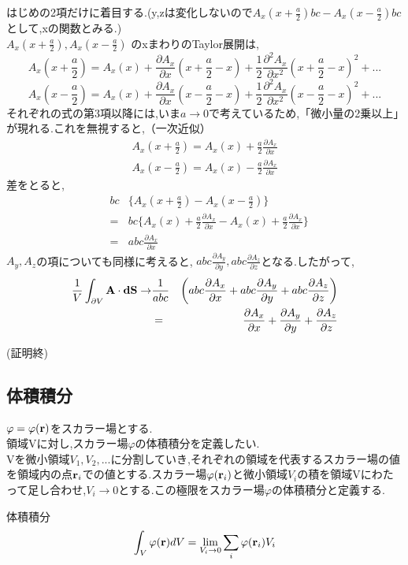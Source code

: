 \documentclass[../main]{subfiles}
\begin{document}
はじめの2項だけに着目する.(y,zは変化しないので$A_x(x+\frac{a}{2})bc-A_x(x-\frac{a}{2})bc$として,xの関数とみる.)\\
$A_x(x+\frac{a}{2}),A_x(x-\frac{a}{2})$ のxまわりのTaylor展開は,\\
\begin{equation}
A_x(x+\frac{a}{2})=A_x(x)+\frac{\partial A_x}{\partial x}(x+\frac{a}{2}-x)+\frac{1}{2}\frac{\partial^2 A_x}{\partial x^2}(x+\frac{a}{2}-x)^2+...
\end{equation}
\begin{equation}
A_x(x-\frac{a}{2})=A_x(x)+\frac{\partial A_x}{\partial x}(x-\frac{a}{2}-x)+\frac{1}{2}\frac{\partial^2 A_x}{\partial x^2}(x-\frac{a}{2}-x)^2+...
\end{equation}
それぞれの式の第3項以降には,いま$a \to 0$で考えているため,「微小量の2乗以上」が現れる.これを無視すると,（一次近似）
\begin{eqnarray}
A_x(x+\frac{a}{2})=A_x(x)+\frac{a}{2}\frac{\partial A_x}{\partial x}\\
A_x(x-\frac{a}{2})=A_x(x)-\frac{a}{2}\frac{\partial A_x}{\partial x}
\end{eqnarray}
差をとると,
\begin{eqnarray}
&bc&\{A_x(x+\frac{a}{2})-A_x(x-\frac{a}{2})\}\\
&=&bc\{ A_x(x)+\frac{a}{2}\frac{\partial A_x}{\partial x}-A_x(x)+\frac{a}{2}\frac{\partial A_x}{\partial x} \} \\
&=&abc\frac{\partial A_x}{\partial x}
\end{eqnarray}
$A_y,A_z$の項についても同様に考えると, $ abc\frac{\partial A_y}{\partial y},abc\frac{\partial A_z}{\partial z} $となる.したがって,
\begin{eqnarray}
\frac{1}{V}\int_{\partial V}^{}{\bf A}\cdot {\bf dS} \to &\frac{1}{abc}&\left(abc\frac{\partial A_x}{\partial x}+abc\frac{\partial A_y}{\partial y}+abc\frac{\partial A_z}{\partial z} \right)\\
&=&\frac{\partial A_x}{\partial x}+\frac{\partial A_y}{\partial y}+\frac{\partial A_z}{\partial z}
\end{eqnarray}
\begin{flushright}
(証明終)
\end{flushright}

\subsection{体積積分}
$\varphi=\varphi({\bf r})$をスカラー場とする.\\
領域Vに対し,スカラー場$\varphi$の体積積分を定義したい.\\
Vを微小領域$V_1,V_2,...$に分割していき,それぞれの領域を代表するスカラー場の値を領域内の点${\bf r}_i$での値とする.スカラー場$\varphi({\bf r}_i)$と微小領域$V_i$の積を領域Vにわたって足し合わせ,$V_i \to 0$とする.この極限をスカラー場$\varphi$の体積積分と定義する.
\begin{itembox}[c]{体積積分}
\begin{equation}
\int_{V}^{}\varphi({\bf r})dV = \lim_{V_i \to 0}\sum_{i}^{}\varphi({\bf r}_i)V_i
\end{equation}
\end{itembox}
\end{document}
